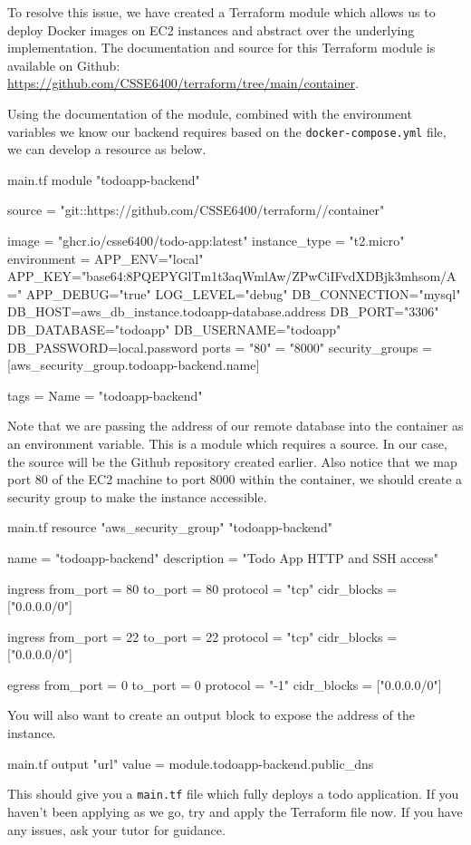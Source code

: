 \documentclass{csse4400}
\begin{document}
To resolve this issue,
we have created a Terraform module which allows us to deploy Docker images on EC2 instances and abstract over the underlying implementation.
The documentation and source for this Terraform module is available on Github: \url{https://github.com/CSSE6400/terraform/tree/main/container}.

Using the documentation of the module,
combined with the environment variables we know our backend requires based on the \texttt{docker-compose.yml} file,
we can develop a resource as below.

\begin{code}[language=terraform]{main.tf}
module "todoapp-backend" {
  source = "git::https://github.com/CSSE6400/terraform//container"
  
  image = "ghcr.io/csse6400/todo-app:latest"
  instance_type = "t2.micro"
  environment = {
    APP_ENV="local"
    APP_KEY="base64:8PQEPYGlTm1t3aqWmlAw/ZPwCiIFvdXDBjk3mhsom/A="
    APP_DEBUG="true"
    LOG_LEVEL="debug"
    DB_CONNECTION="mysql"
    DB_HOST=aws_db_instance.todoapp-database.address
    DB_PORT="3306"
    DB_DATABASE="todoapp"
    DB_USERNAME="todoapp"
    DB_PASSWORD=local.password
  }
  ports = {
    "80" = "8000"
  }
  security_groups = [aws_security_group.todoapp-backend.name]

  tags = {
    Name = "todoapp-backend"
  }
}
\end{code}

Note that we are passing the address of our remote database into the container as an environment variable.
This is a module which requires a source.
In our case, the source will be the Github repository created earlier.
Also notice that we map port 80 of the EC2 machine to port 8000 within the container,
we should create a security group to make the instance accessible.

\begin{code}[language=terraform]{main.tf}
resource "aws_security_group" "todoapp-backend" {
  name = "todoapp-backend"
  description = "Todo App HTTP and SSH access"

  ingress {
    from_port = 80
    to_port = 80
    protocol = "tcp"
    cidr_blocks = ["0.0.0.0/0"]
  }

  ingress {
    from_port = 22
    to_port = 22
    protocol = "tcp"
    cidr_blocks = ["0.0.0.0/0"]
  }

  egress {
    from_port = 0
    to_port = 0
    protocol = "-1"
    cidr_blocks = ["0.0.0.0/0"]
  }
}
\end{code}

You will also want to create an output block to expose the address of the instance.
  
\begin{code}[language=terraform]{main.tf}
output "url" {
  value = module.todoapp-backend.public_dns
}
\end{code}

This should give you a \texttt{main.tf} file which fully deploys a todo application.
If you haven't been applying as we go,
try and apply the Terraform file now.
If you have any issues,
ask your tutor for guidance.



\end{document}

